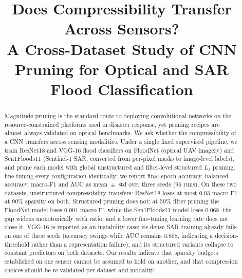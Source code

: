 \documentclass[conference]{IEEEtran}
\newcommand{\TODO}[1]{\textcolor{red}{[TODO: #1]}}
\begin{document}
\title{Does Compressibility Transfer Across Sensors?\\
A Cross-Dataset Study of CNN Pruning for Optical and SAR Flood
Classification}

\author{
\and
\IEEEauthorblockN{\TODO{supervisor name}}
\IEEEauthorblockA{\textit{\TODO{department}} \\
\textit{\TODO{university}}\\
\TODO{city, country} \\
\TODO{email}}
}

\maketitle

\begin{abstract}
Magnitude pruning is the standard route to deploying convolutional
networks on the resource-constrained platforms used in disaster
response, yet pruning recipes are almost always validated on optical
benchmarks. We ask whether the compressibility of a CNN transfers
across sensing modalities. Under a single fixed supervised pipeline, we
train ResNet18 and VGG-16 flood classifiers on FloodNet (optical UAV
imagery) and Sen1Floods11 (Sentinel-1 SAR, converted from per-pixel
masks to image-level labels), and prune each model with global
unstructured and filter-level structured $L_1$ pruning, fine-tuning
every configuration identically; we report final-epoch accuracy,
balanced accuracy, macro-F1 and AUC as mean~$\pm$~std over three seeds
(96 runs). On these two datasets, unstructured compressibility
transfers: ResNet18 loses at most $0.03$ macro-F1 at 90\% sparsity on
both. Structured pruning does not: at 50\% filter pruning the
FloodNet model loses $0.001$ macro-F1 while the Sen1Floods11 model
loses $0.068$, the gap widens monotonically with ratio, and a lower
fine-tuning learning rate does not close it. VGG-16 is reported as an
instability case: its dense SAR training already fails on one of three
seeds (accuracy swings while AUC remains $0.858$, indicating a
decision-threshold rather than a representation failure), and its
structured variants collapse to constant predictors on both datasets.
Our results indicate that sparsity budgets established on one sensor
cannot be assumed to hold on another, and that compression choices
should be re-validated per dataset and modality.
\end{abstract}
\end{document}
